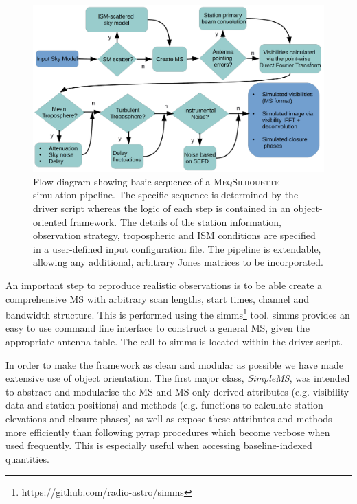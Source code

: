 \begin{figure}
\begin{center}
\includegraphics[width=\columnwidth]{Images/flow_full}
\caption{Flow diagram showing basic sequence of a \textsc{MeqSilhouette} simulation pipeline. The specific sequence is determined by the driver script whereas the logic of each step is contained in an object-oriented framework. The details of the station information, observation strategy, tropospheric and ISM conditions are specified in a user-defined input configuration file. The pipeline is extendable, allowing any additional, arbitrary Jones matrices to be incorporated. \label{flow}%
}
\end{center}
\end{figure}

An important step to reproduce realistic observations is to be able create a comprehensive MS with arbitrary scan lengths, start times, channel and bandwidth structure. This is performed using the {\sc simms}\footnote{https://github.com/radio-astro/simms} tool. {\sc simms} provides an easy to use command line interface to construct a general MS, given the appropriate antenna table. The call to {\sc simms} is located within the driver script. 

In order to make the framework as clean and  modular as possible we have made extensive use of object orientation. The first major class, \emph{SimpleMS}, was intended to abstract and modularise the MS and MS-only derived attributes (e.g. visibility data and station positions) and methods (e.g. functions to calculate station elevations and closure phases) as well as expose these attributes and methods more efficiently than following {\sc pyrap} procedures which become verbose when used frequently. This is especially useful when accessing baseline-indexed quantities. 

